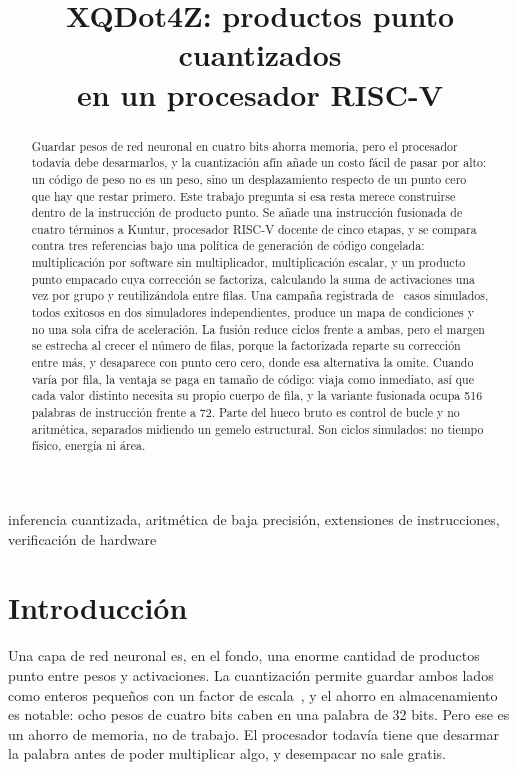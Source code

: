 \title{XQDot4Z: productos punto cuantizados\\en un procesador RISC-V}
\author{}
\maketitle
\begin{abstract}
Guardar pesos de red neuronal en cuatro bits ahorra memoria, pero el procesador
todavía debe desarmarlos, y la cuantización afín añade un costo fácil de pasar
por alto: un código de peso no es un peso, sino un desplazamiento respecto de un
punto cero que hay que restar primero. Este trabajo pregunta si
esa resta merece construirse dentro de la instrucción de producto punto. Se
añade una instrucción fusionada de cuatro términos a Kuntur, procesador RISC-V
docente de cinco etapas, y se compara contra tres referencias bajo una política
de generación de código congelada: multiplicación por software sin
multiplicador, multiplicación escalar, y un producto punto empacado cuya
corrección se factoriza, calculando la suma de activaciones una vez por grupo y
reutilizándola entre filas. Una campaña registrada de \CampaignCases\ casos simulados,
todos exitosos en dos simuladores independientes, produce un mapa de condiciones
y no una sola cifra de aceleración. La fusión reduce ciclos frente a ambas,
pero el margen se estrecha al crecer el número de filas, porque la factorizada
reparte su corrección entre más, y desaparece con punto cero cero, donde esa
alternativa la omite. Cuando varía por fila,
la ventaja se paga en tamaño de código: viaja como inmediato, así que cada valor
distinto necesita su propio cuerpo de fila, y la variante fusionada ocupa 516
palabras de instrucción frente a 72. Parte del hueco bruto es control de bucle y
no aritmética, separados midiendo un gemelo estructural. Son ciclos simulados:
no tiempo físico, energía ni área.
\end{abstract}
\begin{IEEEkeywords}
inferencia cuantizada, aritmética de baja precisión, extensiones de instrucciones,
verificación de hardware
\end{IEEEkeywords}
\suppressfloats[t]

\section{Introducción}
Una capa de red neuronal es, en el fondo, una enorme cantidad de productos punto
entre pesos y activaciones. La cuantización permite guardar ambos lados como
enteros pequeños con un factor de escala~\cite{jacob}, y el ahorro en
almacenamiento es notable: ocho pesos de cuatro bits caben en una palabra de 32
bits. Pero ese es un ahorro de memoria, no de trabajo. El procesador todavía
tiene que desarmar la palabra antes de poder multiplicar algo, y desempacar no
sale gratis.

